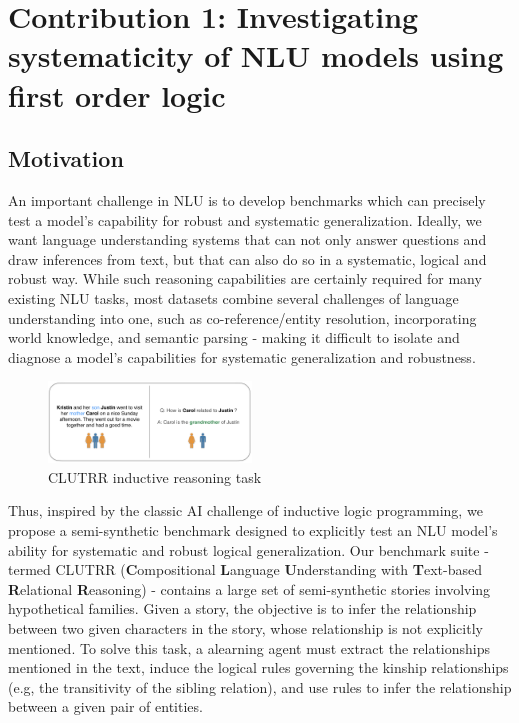 \documentclass[12pt]{article}
\begin{document}
\section{Contribution 1: Investigating systematicity of NLU models using first order logic}
\label{sec:cont1}

\subsection{Motivation}

An important challenge in NLU is to develop benchmarks which can precisely test a model's capability for robust and systematic generalization. Ideally, we want language understanding systems that can not only answer questions and draw inferences from text, but that can also do so in a systematic, logical and robust way. While such reasoning capabilities are certainly required for many existing NLU tasks, most datasets combine several challenges of language understanding into one, such as co-reference/entity resolution, incorporating world knowledge, and semantic parsing - making it difficult to isolate and diagnose a model's capabilities for systematic generalization and robustness.

\begin{figure}
\begin{center}
  \includegraphics[width=0.48\textwidth]{images/clutrr_text.png}
\end{center}
\caption{CLUTRR inductive reasoning task}
\label{fig:clutrr_data}
\end{figure}



Thus, inspired by the classic AI challenge of inductive logic programming, we propose a semi-synthetic benchmark designed to explicitly test an NLU model's ability for systematic and robust logical generalization. Our benchmark suite - termed CLUTRR (\textbf{C}ompositional \textbf{L}anguage \textbf{U}nderstanding with \textbf{T}ext-based \textbf{R}elational \textbf{R}easoning) - contains a large set of semi-synthetic stories involving hypothetical families. Given a story, the objective is to infer the relationship between two given characters in the story, whose relationship is not explicitly mentioned. To solve this task, a alearning agent must extract the relationships mentioned in the text, induce the logical rules governing the kinship relationships (e.g, the transitivity of the sibling relation), and use rules to infer the relationship between a given pair of entities.
\end{document}
